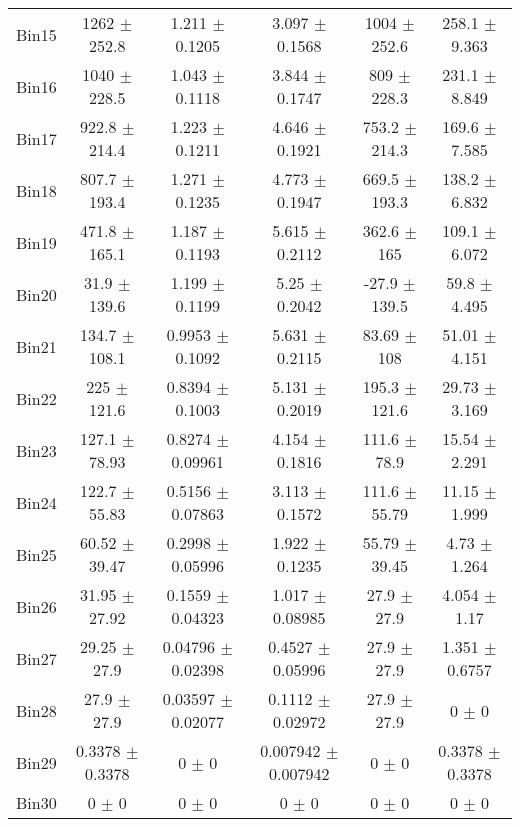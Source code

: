 \begin{tabular}{@{\extracolsep{4pt}}lccccc@{}}
     Bin15 & 1262 $\pm$ 252.8 & 1.211 $\pm$ 0.1205 & 3.097 $\pm$ 0.1568 & 1004 $\pm$ 252.6 & 258.1 $\pm$ 9.363 \\ 
     Bin16 & 1040 $\pm$ 228.5 & 1.043 $\pm$ 0.1118 & 3.844 $\pm$ 0.1747 & 809 $\pm$ 228.3 & 231.1 $\pm$ 8.849 \\ 
     Bin17 & 922.8 $\pm$ 214.4 & 1.223 $\pm$ 0.1211 & 4.646 $\pm$ 0.1921 & 753.2 $\pm$ 214.3 & 169.6 $\pm$ 7.585 \\ 
     Bin18 & 807.7 $\pm$ 193.4 & 1.271 $\pm$ 0.1235 & 4.773 $\pm$ 0.1947 & 669.5 $\pm$ 193.3 & 138.2 $\pm$ 6.832 \\ 
     Bin19 & 471.8 $\pm$ 165.1 & 1.187 $\pm$ 0.1193 & 5.615 $\pm$ 0.2112 & 362.6 $\pm$ 165 & 109.1 $\pm$ 6.072 \\ 
     Bin20 & 31.9 $\pm$ 139.6 & 1.199 $\pm$ 0.1199 & 5.25 $\pm$ 0.2042 & -27.9 $\pm$ 139.5 & 59.8 $\pm$ 4.495 \\ 
     Bin21 & 134.7 $\pm$ 108.1 & 0.9953 $\pm$ 0.1092 & 5.631 $\pm$ 0.2115 & 83.69 $\pm$ 108 & 51.01 $\pm$ 4.151 \\ 
     Bin22 & 225 $\pm$ 121.6 & 0.8394 $\pm$ 0.1003 & 5.131 $\pm$ 0.2019 & 195.3 $\pm$ 121.6 & 29.73 $\pm$ 3.169 \\ 
     Bin23 & 127.1 $\pm$ 78.93 & 0.8274 $\pm$ 0.09961 & 4.154 $\pm$ 0.1816 & 111.6 $\pm$ 78.9 & 15.54 $\pm$ 2.291 \\ 
     Bin24 & 122.7 $\pm$ 55.83 & 0.5156 $\pm$ 0.07863 & 3.113 $\pm$ 0.1572 & 111.6 $\pm$ 55.79 & 11.15 $\pm$ 1.999 \\ 
     Bin25 & 60.52 $\pm$ 39.47 & 0.2998 $\pm$ 0.05996 & 1.922 $\pm$ 0.1235 & 55.79 $\pm$ 39.45 & 4.73 $\pm$ 1.264 \\ 
     Bin26 & 31.95 $\pm$ 27.92 & 0.1559 $\pm$ 0.04323 & 1.017 $\pm$ 0.08985 & 27.9 $\pm$ 27.9 & 4.054 $\pm$ 1.17 \\ 
     Bin27 & 29.25 $\pm$ 27.9 & 0.04796 $\pm$ 0.02398 & 0.4527 $\pm$ 0.05996 & 27.9 $\pm$ 27.9 & 1.351 $\pm$ 0.6757 \\ 
     Bin28 & 27.9 $\pm$ 27.9 & 0.03597 $\pm$ 0.02077 & 0.1112 $\pm$ 0.02972 & 27.9 $\pm$ 27.9 & 0 $\pm$ 0 \\ 
     Bin29 & 0.3378 $\pm$ 0.3378 & 0 $\pm$ 0 & 0.007942 $\pm$ 0.007942 & 0 $\pm$ 0 & 0.3378 $\pm$ 0.3378 \\ 
     Bin30 & 0 $\pm$ 0 & 0 $\pm$ 0 & 0 $\pm$ 0 & 0 $\pm$ 0 & 0 $\pm$ 0 \\ 
\hline\hline
  \end{tabular}
